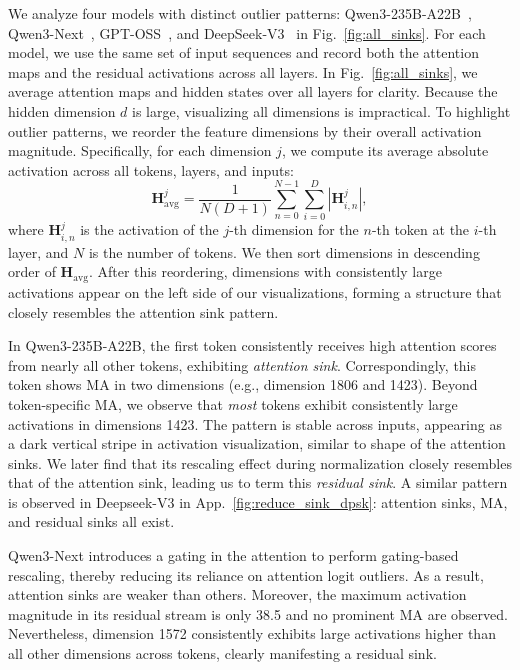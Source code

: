 \documentclass{article} %
\begin{document}
We analyze four models with distinct outlier patterns: Qwen3-235B-A22B~\citep{yang2025qwen3}, Qwen3-Next~\citep{yang2025qwen3}, GPT-OSS~\citep{agarwal2025gpt}, and DeepSeek-V3~\citep{liu2024deepseek} in Fig.~\ref{fig:all_sinks}. 
For each model, we use the same set of input sequences and record both the attention maps and the residual activations across all layers.
In Fig.~\ref{fig:all_sinks}, we average attention maps and hidden states over all layers for clarity.
Because the hidden dimension \(d\) is large, visualizing all dimensions is impractical. 
To highlight outlier patterns, we reorder the feature dimensions by their overall activation magnitude. 
Specifically, for each dimension \(j\), we compute its average absolute activation across all tokens, layers, and inputs:
\[
\mathbf{H}^j_{\text{avg}} = \frac{1}{N(D+1)} \sum_{n=0}^{N-1} \sum_{i=0}^{D} |\mathbf{H}^j_{i,n}|,
\]
where \(\mathbf{H}^j_{i,n}\) is the activation of the \(j\)-th dimension for the \(n\)-th token at the \(i\)-th layer, and \(N\) is the number of tokens. 
We then sort dimensions in descending order of \(\mathbf{H}_{\text{avg}}\).
After this reordering, dimensions with consistently large activations appear on the left side of our visualizations, forming a structure that closely resembles the attention sink pattern.

In Qwen3-235B-A22B, the first token consistently receives high attention scores from nearly all other tokens, exhibiting \textit{attention sink}.
Correspondingly, this token shows MA in two dimensions (e.g., dimension 1806 and 1423). 
Beyond token-specific MA, we observe that \textit{most} tokens exhibit consistently large activations in dimensions 1423.
The pattern is stable across inputs, appearing as a dark vertical stripe in activation visualization, similar to shape of the attention sinks. 
We later find that its rescaling effect during normalization closely resembles that of the attention sink, leading us to term this \textit{residual sink}.
A similar pattern is observed in Deepseek-V3 in App.~\ref{fig:reduce_sink_dpsk}: attention sinks, MA, and residual sinks all exist.

Qwen3-Next introduces a gating in the attention to perform gating-based rescaling, thereby reducing its reliance on attention logit outliers.
As a result, attention sinks are weaker than others. 
Moreover, the maximum activation magnitude in its residual stream is only 38.5 and no prominent MA are observed. 
Nevertheless, dimension 1572 consistently exhibits large activations higher than all other dimensions across tokens, clearly manifesting a residual sink.
\end{document}
